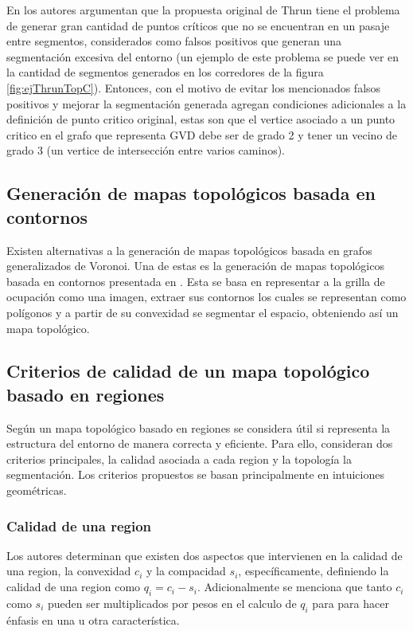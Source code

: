 
En \cite{wurm2008coordinated} los autores argumentan que la propuesta original de Thrun tiene el problema de generar gran cantidad de puntos críticos que no se encuentran en un pasaje entre segmentos, considerados como falsos positivos que generan una segmentación excesiva del entorno (un ejemplo de este problema se puede ver en la cantidad de segmentos generados en los corredores de la figura \ref{fig:ejThrunTopC}). Entonces, con el motivo de evitar los mencionados falsos positivos y mejorar la segmentación generada agregan condiciones adicionales a la definición de punto critico original, estas son que el vertice asociado a un punto critico en el grafo que representa GVD debe ser de grado 2 y tener un vecino de grado 3 (un vertice de intersección entre varios caminos). 

\subsection[Generación de mapas topológicos basada en contornos]{Generación de mapas topológicos basada en\\ contornos}
Existen alternativas a la generación de mapas topológicos basada en grafos generalizados de Voronoi. Una de estas es la generación de mapas topológicos basada en contornos presentada en \cite{Fermin-Leon2017}. Esta se basa en representar a la grilla de ocupación como una imagen, extraer sus contornos los cuales se representan como polígonos y a partir de su convexidad se segmentar el espacio, obteniendo así un mapa topológico.

\subsection{Criterios de calidad de un mapa topológico basado en regiones}
Según \cite{Liu2015} un mapa topológico basado en regiones se considera útil si representa la estructura del entorno de manera correcta y eficiente. Para ello, consideran dos criterios principales, la calidad asociada a cada region y la topología la segmentación. Los criterios propuestos se basan principalmente en intuiciones geométricas. 

\subsubsection{Calidad de una region}
Los autores determinan que existen dos aspectos que intervienen en la calidad de una region, la convexidad $c_i$ y la compacidad $s_i$, específicamente, definiendo la calidad de una region como $q_i = c_i - s_i$. Adicionalmente se menciona que tanto $c_i$ como $s_i$ pueden ser multiplicados por pesos en el calculo de $q_i$ para  para hacer énfasis en una u otra característica.


